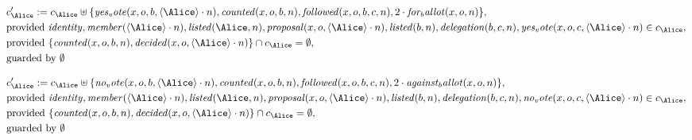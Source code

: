 \begin{align*}
&
c'_
{
\Alice
}
 := 
c_
{
\Alice
}
 \uplus 
\{
\mathit{
yes_vote
}
(
x
,
o
,
b
,
\langle
\Alice
\rangle
\cdot
n
)
,
\mathit{
counted
}
(
x
,
o
,
b
,
n
)
,
\mathit{
followed
}
(
x
,
o
,
b
,
c
,
n
)
,
2
\cdot
\mathit{
for_ballot
}
(
x
,
o
,
n
)
\}
,\\
&
\text{provided } 
\mathit{
identity
}
,
\mathit{
member
}
(
\langle
\Alice
\rangle
\cdot
n
)
,
\mathit{
listed
}
(
\Alice
,
n
)
,
\mathit{
proposal
}
(
x
,
o
,
\langle
\Alice
\rangle
\cdot
n
)
,
\mathit{
listed
}
(
b
,
n
)
,
\mathit{
delegation
}
(
b
,
c
,
n
)
,
\mathit{
yes_vote
}
(
x
,
o
,
c
,
\langle
\Alice
\rangle
\cdot
n
)
 \in c_
{
\Alice
}
,\\
&
\text{provided } 
\{
\mathit{
counted
}
(
x
,
o
,
b
,
n
)
,
\mathit{
decided
}
(
x
,
o
,
\langle
\Alice
\rangle
\cdot
n
)
\}
 \cap c_
{
\Alice
}
 = \emptyset
,\\
&
\text{guarded by } \emptyset
\end{align*}

\begin{align*}
&
c'_
{
\Alice
}
 := 
c_
{
\Alice
}
 \uplus 
\{
\mathit{
no_vote
}
(
x
,
o
,
b
,
\langle
\Alice
\rangle
\cdot
n
)
,
\mathit{
counted
}
(
x
,
o
,
b
,
n
)
,
\mathit{
followed
}
(
x
,
o
,
b
,
c
,
n
)
,
2
\cdot
\mathit{
against_ballot
}
(
x
,
o
,
n
)
\}
,\\
&
\text{provided } 
\mathit{
identity
}
,
\mathit{
member
}
(
\langle
\Alice
\rangle
\cdot
n
)
,
\mathit{
listed
}
(
\Alice
,
n
)
,
\mathit{
proposal
}
(
x
,
o
,
\langle
\Alice
\rangle
\cdot
n
)
,
\mathit{
listed
}
(
b
,
n
)
,
\mathit{
delegation
}
(
b
,
c
,
n
)
,
\mathit{
no_vote
}
(
x
,
o
,
c
,
\langle
\Alice
\rangle
\cdot
n
)
 \in c_
{
\Alice
}
,\\
&
\text{provided } 
\{
\mathit{
counted
}
(
x
,
o
,
b
,
n
)
,
\mathit{
decided
}
(
x
,
o
,
\langle
\Alice
\rangle
\cdot
n
)
\}
 \cap c_
{
\Alice
}
 = \emptyset
,\\
&
\text{guarded by } \emptyset
\end{align*}
